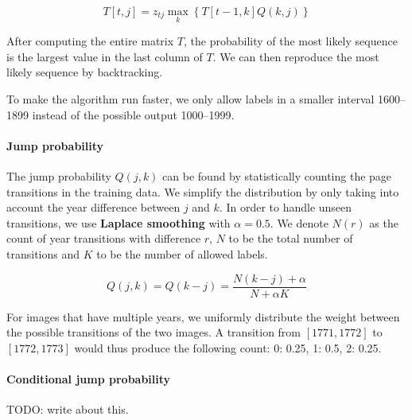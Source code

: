 \[
T[t,j] = z_{tj} \max_k \left\{ T[t-1,k] Q(k, j) \right\}
\]

After computing the entire matrix $T$, the probability of the most likely sequence is the largest value in the last column of $T$. We can then reproduce the most likely sequence by backtracking.

To make the algorithm run faster, we only allow labels in a smaller interval 1600--1899 instead of the possible output 1000--1999.

\paragraph{Jump probability}
The jump probability $Q(j, k)$ can be found by statistically counting the page transitions in the training data. We simplify the distribution by only taking into account the year difference between $j$ and $k$. In order to handle unseen transitions, we use \textbf{Laplace smoothing} with $\alpha=0.5$. We denote $N(r)$ as the count of year transitions with difference $r$, $N$ to be the total number of transitions and $K$ to be the number of allowed labels.

\[
Q(j, k) = Q(k-j) = \frac{N(k-j) + \alpha}{N + \alpha K}
\]

For images that have multiple years, we uniformly distribute the weight between the possible transitions of the two images. A transition from $[1771, 1772]$ to $[1772, 1773]$ would thus produce the following count: {0: 0.25, 1: 0.5, 2: 0.25}.

\paragraph{Conditional jump probability}
TODO: write about this.

